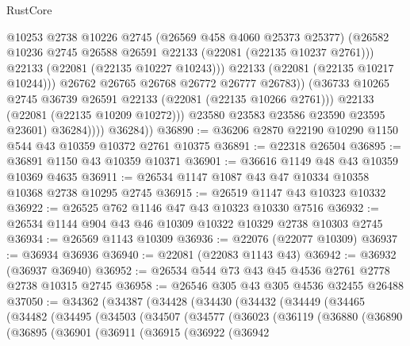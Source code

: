 \begin{lexlean}{RustCore}
\begin{coremodule}
                            @10253
                            @2738
                            @10226
                            @2745
                            (@26569 @458 @4060 @25373 @25377)
                            (@26582
                              @10236
                              @2745
                              @26588
                              @26591
                              @22133
                              (@22081 (@22135 @10237 @2761)))
                            @22133
                            (@22081 (@22135 @10227 @10243)))
                          @22133
                          (@22081 (@22135 @10217 @10244)))
                        @26762
                        @26765
                        @26768
                        @26772
                        @26777
                        @26783))
                    (@36733 @10265 @2745 @36739 @26591 @22133 (@22081 (@22135 @10266 @2761)))
                    @22133
                    (@22081 (@22135 @10209 @10272)))
                  @23580
                  @23583
                  @23586
                  @23590
                  @23595
                  @23601)
                @36284))))
        @36284))
@36890 := @36206 @2870 @22190 @10290 @1150 @544 @43 @10359 @10372 @2761 @10375
@36891 := @22318 @26504
@36895 := @36891 @1150 @43 @10359 @10371
@36901 := @36616 @1149 @48 @43 @10359 @10369 @4635
@36911 := @26534 @1147 @1087 @43 @47 @10334 @10358 @10368 @2738 @10295 @2745
@36915 := @26519 @1147 @43 @10323 @10332
@36922 := @26525 @762 @1146 @47 @43 @10323 @10330 @7516
@36932 := @26534 @1144 @904 @43 @46 @10309 @10322 @10329 @2738 @10303 @2745
@36934 := @26569 @1143 @10309
@36936 := @22076 (@22077 @10309)
@36937 := @36934 @36936
@36940 := @22081 (@22083 @1143 @43)
@36942 := @36932 (@36937 @36940)
@36952 := @26534 @544 @73 @43 @45 @4536 @2761 @2778 @2738 @10315 @2745
@36958 := @26546 @305 @43 @305 @4536 @32455 @26488
@37050 := @34362
    (@34387
      (@34428
        (@34430
          (@34432
            (@34449
              (@34465
                (@34482
                  (@34495
                    (@34503
                      (@34507
                        (@34577
                          (@36023
                            (@36119
                              (@36880
                                (@36890
                                  (@36895
                                    (@36901
                                      (@36911
                                        (@36915
                                          (@36922
                                            (@36942

\end{coremodule}
\end{lexlean}
